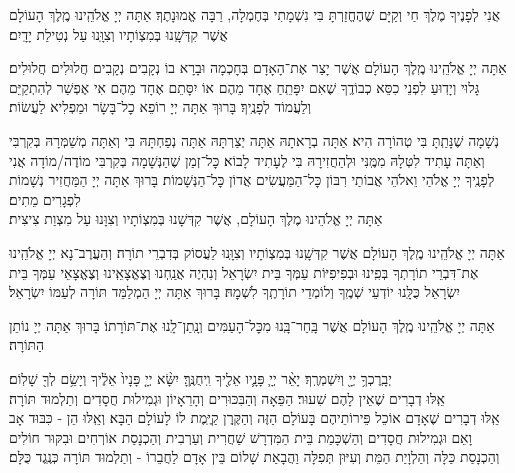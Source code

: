 \documentclass[twoside, openany, parskip=half, 11pt]{book}
\begin{document}
אֲנִי לְפָנֶיךָ מֶלֶךְ חַי וְקַיָּם שֶׁהֶחֱזַרְתָּ בִּי נִשְׁמָתִי בְּחֶמְלָה, רַבָּה אֱמוּנָתֶךָ׃
אַתָּה יְיָ אֱלֹהֵֽינוּ מֶֽלֶךְ הָעוֹלָם אֲשֶׁר קִדְּשָֽׁנוּ בְּמִצְוֹתָיו וְצִוָּֽנוּ עַל נְטִילַת יָדָֽיִם׃

אַתָּה יְיָ אֱלֹהֵֽינוּ מֶֽלֶךְ הָעוֹלָם אֲשֶׁר יָצַר אֶת־הָאָדָם בְּחׇכְמָה וּבָרָא בוֹ נְקָבִים נְקָבִים חֲלוּלִים חֲלוּלִים׃ גָּלוּי וְיָדֽוּעַ לִפְנֵי כִסֵּא כְבוֹדֶֽךָ שֶׁאִם יִפָּתֵֽחַ אֶחָד מֵהֶם אוֹ יִסָּתֵם אֶחָד מֵהֶם אִי אֶפְשַׁר לְהִתְקַיֵּם וְלַעֲמוֹד לְפָנֶֽיךָ׃ בָּרוּךְ אַתָּה יְיָ רוֹפֵא כׇל־בָּשָׂר וּמַפְלִיא לַעֲשׂוֹת׃


נְשָׁמָה שֶׁנָּתַֽתָּ בִּי טְהוֹרָה הִיא׃ אַתָּה בְרָאתָהּ אַתָּה יְצַרְתָּהּ אַתָּה נְפַחְתָּהּ בִּי וְאַתָּה מְשַׁמְּרָהּ בְּקִרְבִּי וְאַתָּה עָתִיד לִטְּלָהּ מִמֶּֽנִּי וּלְהַחֲזִירָהּ בִּי לֶעָתִיד לָבוֹא׃ כׇּל־זְמַן שֶׁהַנְּשָׁמָה בְּקִרְבִּי מוֹדֶה/מוֹדָה אֲנִי לְפָנֶֽיךָ יְיָ אֱלֹהַי וֵאלֹהֵי אֲבוֹתַי רִבּוֹן כׇּל־הַמַּעֲשִׂים אֲדוֹן כׇּל־הַנְּשָׁמוֹת׃ בָּרוּךְ אַתָּה יְיָ הַמַּחֲזִיר נְשָׁמוֹת לִפְגָרִים מֵתִים׃\\
אַתָּה יְיָ אֱלֹהֵינוּ מֶלֶךְ הָעוֹלָם, אֲשֶׁר קִדְּשָׁנוּ בְּמִצְוֹתָיו וְצִוָּנוּ עַל מִצְוַת צִיצִית׃

אַתָּה יְיָ אֱלֹהֵֽינוּ מֶֽלֶךְ הָעוֹלָם אֲשֶׁר קִדְּשָֽׁנוּ בְּמִצְוֹתָיו וְצִוָּֽנוּ לַעֲסוֹק בְּדִבְרֵי תוֹרָה׃ וְהַעֲרֶב־נָא יְיָ אֱלֹהֵֽינוּ אֶת־דִּבְרֵי תוֹרָתְךָ בְּפִֽינוּ וּבְפִיפִיּוֹת עַמְּךָ בֵּית יִשְׂרָאֵל וְנִהְיֶה אֲנַֽחְנוּ וְצֶאֱצָאֵֽינוּ וְצֶאֱצָאֵי עַמְּךָ בֵּית יִשְׂרָאֵל כֻּלָּֽנוּ יוֹדְעֵי שְׁמֶֽךָ וְלוֹמְדֵי תוֹרָתֶֽךָ לִשְׁמׇהּ׃ בָּרוּךְ אַתָּה יְיָ הַמְלַמֵּד תּוֹרָה לְעַמּוֹ יִשְׂרָאֵל׃

אַתָּה יְיָ אֱלֹהֵֽינוּ מֶֽלֶךְ הָעוֹלָם אֲשֶׁר בָּֽחַר־בָּֽנוּ מִכׇּל־הָעַמִּים וְנָֽתַן־לָֽנוּ אֶת־תּוֹרָתוֹ׃ בָּרוּךְ אַתָּה יְיָ נוֹתֵן הַתּוֹרָה׃



יְבָֽרֶכְךָ֥ יְיָ֖ וְיִשְׁמְרֶֽךָ׃ יָאֵ֨ר יְיָ֧ פָּנָ֛יו אֵלֶ֖יךָ וִֽיחֻנֶּֽךָּ׃ יִשָּׂ֨א יְיָ֤ פָּנָיו֙ אֵלֶ֔יךָ וְיָשֵׂ֥ם לְךָ֖ שָׁלֽוֹם׃\\
אֵֽלּוּ דְבָרִים שֶׁאֵין לָהֶם שִׁעוּר׃ הַפֵּאָה וְהַבִּכּוּרִים וְהָרֵאָיוֹן וּגְמִילוּת חֲסָדִים וְתַלְמוּד תּוֹרָה׃\\
אֵֽלּוּ דְבָרִים שֶׁאָדָם אוֹכֵל פֵּירוֹתֵיהֶם בָּעוֹלָם הַזֶּה וְהַקֶּֽרֶן קַיֶּֽמֶת לוֹ לָעוֹלָם הַבָּא׃ וְאֵֽלּוּ הֵן - כִּבּוּד אָב וָאֵם וּגְמִילוּת חֲסָדִים וְהַשְׁכָּמַת בֵּית הַמִּדְרָשׁ שַׁחֲרִית וְעַרְבִית וְהַכְנָסַת אוֹרְחִים וּבִקּוּר חוֹלִים וְהַכְנָסַת כַּלָּה וְהַלְוָיַת הַמֵּת וְעִיּוּן תְּפִלָּה וַהֲבָאַת שָׁלוֹם בֵּין אָדָם לַחֲבֵרוֹ - וְתַלְמוּד תּוֹרָה כְּנֶֽגֶד כֻּלָּם׃
\end{document}
